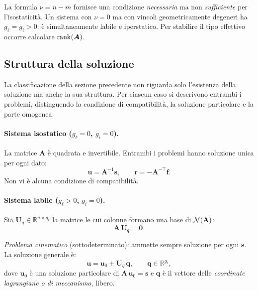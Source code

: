 \begin{oss}
	La formula $\nu = n - m$ fornisce una condizione
	\emph{necessaria} ma non \emph{sufficiente} per
	l'isostaticità. Un sistema con $\nu = 0$ ma con vincoli
	geometricamente degeneri ha $g_\ell = g_i > 0$:
	è simultaneamente labile e iperstatico. Per stabilire
	il tipo effettivo occorre calcolare $\operatorname{rank}(\bm{A})$.
\end{oss}


\subsection{Struttura della soluzione}
\label{sec:struttura_soluzione}

La classificazione della sezione precedente non riguarda solo
l'esistenza della soluzione ma anche la sua struttura. Per
ciascun caso si descrivono entrambi i problemi, distinguendo
la condizione di compatibilità, la soluzione particolare e
la parte omogenea.

\paragraph{Sistema isostatico ($g_\ell = 0$,
	$g_i = 0$).}
La matrice $\bm{A}$ è quadrata e invertibile. Entrambi i
problemi hanno soluzione unica per ogni dato:
\begin{equation}\label{eq:sol_iso}
	\bm{u} = \bm{A}^{-1}\bm{s},
	\qquad
	\bm{r} = -\bm{A}^{-\top}\bm{f}.
\end{equation}
Non vi è alcuna condizione di compatibilità.

\paragraph{Sistema labile ($g_\ell > 0$,
	$g_i = 0$).}
Sia $\bm{U}_q \in \mathbb{R}^{n \times g_\ell}$ la matrice
le cui colonne formano una base di $\mathcal{N}(\mathbf{A})$:
\begin{equation}\label{eq:ker_A_lab}
	\bm{A}\,\bm{U}_q = \bm{0}.
\end{equation}

\noindent\emph{Problema cinematico} (sottodeterminato):
ammette sempre soluzione per ogni $\bm{s}$. La soluzione
generale è:
\begin{equation}\label{eq:sol_lab_cin}
	\bm{u} = \bm{u}_0 + \bm{U}_q\,\bm{q},
	\qquad \bm{q} \in \mathbb{R}^{g_\ell},
\end{equation}
dove $\bm{u}_0$ è una soluzione particolare di
$\bm{A}\,\bm{u}_0 = \bm{s}$ e $\bm{q}$ è il vettore
delle \emph{coordinate lagrangiane o di meccanismo}, libero.


